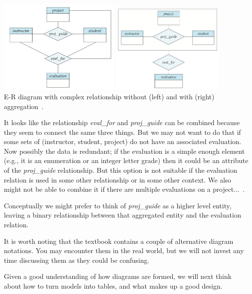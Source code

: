 \begin{center}
\includegraphics[width=0.45\textwidth]{images/unaggregated}
\includegraphics[width=0.42\textwidth]{images/aggregation}\\
E-R diagram with complex relationship without (left) and with (right) aggregation~\cite{dsc}.
\end{center}

It looks like the relationship \textit{eval\_for} and \textit{proj\_guide} can be combined because they seem to connect the same three things. But we may not want to do that if some sets of (instructor, student, project) do not have an associated evaluation. Now possibly the data is redundant; if the evaluation is a simple enough element (e.g., it is an enumeration or an integer letter grade) then it could be an attribute of the \textit{proj\_guide} relationship. But this option is not suitable if the evaluation relation is used in some other relationship or in some other context. We  also might not be able to combine it if there are multiple evaluations on a project...~\cite{dsc}.

Conceptually we might prefer to think of \textit{proj\_guide} as a higher level entity,  leaving a binary relationship between that aggregated entity and the evaluation relation.

It is worth noting that the textbook contains a couple of alternative diagram notations. You may encounter them in the real world, but we will not invest any time discussing them as they could be confusing.

Given a good understanding of how diagrams are formed, we will next think about how to turn models into tables, and what makes up a good design.




